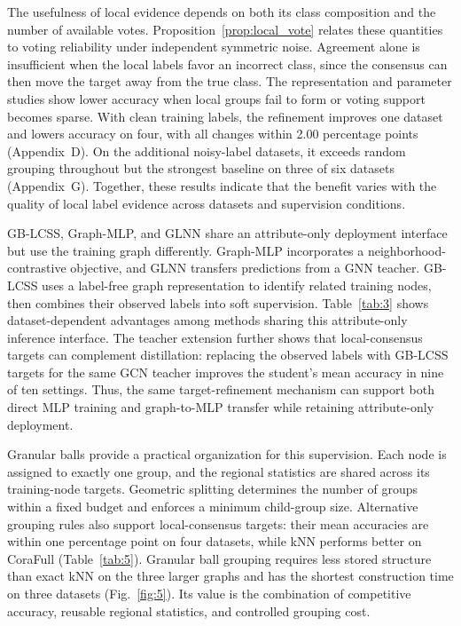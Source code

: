 \documentclass[10pt,letterpaper,nopreprintline]{elsarticle}
\theoremstyle{plain}
\begin{document}
The usefulness of local evidence depends on both its class composition and the number of available votes. Proposition~\ref{prop:local_vote} relates these quantities to voting reliability under independent symmetric noise. Agreement alone is insufficient when the local labels favor an incorrect class, since the consensus can then move the target away from the true class. The representation and parameter studies show lower accuracy when local groups fail to form or voting support becomes sparse. With clean training labels, the refinement improves one dataset and lowers accuracy on four, with all changes within 2.00 percentage points (Appendix~D). On the additional noisy-label datasets, it exceeds random grouping throughout but the strongest baseline on three of six datasets (Appendix~G). Together, these results indicate that the benefit varies with the quality of local label evidence across datasets and supervision conditions.

GB-LCSS, Graph-MLP, and GLNN share an attribute-only deployment interface but use the training graph differently. Graph-MLP incorporates a neighborhood-contrastive objective, and GLNN transfers predictions from a GNN teacher. GB-LCSS uses a label-free graph representation to identify related training nodes, then combines their observed labels into soft supervision. Table~\ref{tab:3} shows dataset-dependent advantages among methods sharing this attribute-only inference interface. The teacher extension further shows that local-consensus targets can complement distillation: replacing the observed labels with GB-LCSS targets for the same GCN teacher improves the student's mean accuracy in nine of ten settings. Thus, the same target-refinement mechanism can support both direct MLP training and graph-to-MLP transfer while retaining attribute-only deployment.

Granular balls provide a practical organization for this supervision. Each node is assigned to exactly one group, and the regional statistics are shared across its training-node targets. Geometric splitting determines the number of groups within a fixed budget and enforces a minimum child-group size. Alternative grouping rules also support local-consensus targets: their mean accuracies are within one percentage point on four datasets, while kNN performs better on CoraFull (Table~\ref{tab:5}). Granular ball grouping requires less stored structure than exact kNN on the three larger graphs and has the shortest construction time on three datasets (Fig.~\ref{fig:5}). Its value is the combination of competitive accuracy, reusable regional statistics, and controlled grouping cost.
\end{document}
